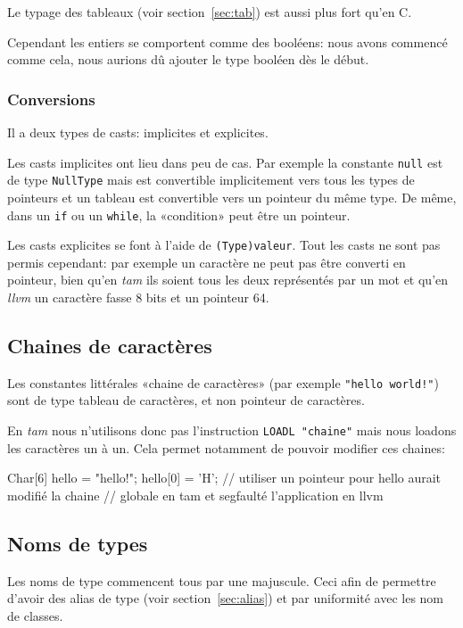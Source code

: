 \documentclass{scrartcl}
\newcommand{\llvm}{\textit{llvm}}
\newcommand{\tam} {\textit{tam}}
\begin{document}
    Le typage des tableaux (voir section~\ref{sec:tab}) est aussi plus fort qu'en C.

    Cependant les entiers se comportent comme des booléens: nous avons commencé
    comme cela, nous aurions dû ajouter le type booléen dès le début.

    \subsubsection{Conversions}
      Il a deux types de casts: implicites et explicites.

      Les casts implicites ont lieu dans peu de cas. Par exemple la constante
      \verb+null+ est de type \verb+NullType+ mais est convertible
      implicitement vers tous les types de pointeurs et un tableau est
      convertible vers un pointeur du même type. De même, dans un \verb+if+ ou
      un \verb+while+, la «condition» peut être un pointeur.

      Les casts explicites se font à l'aide de \verb+(Type)valeur+. Tout les
      casts ne sont pas permis cependant: par exemple un caractère ne peut pas
      être converti en pointeur, bien qu'en \tam{} ils soient tous les deux
      représentés par un mot et qu'en \llvm{} un caractère fasse 8 bits et un
      pointeur 64.

    \subsection{Chaines de caractères}
      Les constantes littérales «chaine de caractères» (par exemple
      \verb+"hello world!"+) sont de type tableau de caractères, et non
      pointeur de caractères.

      En \tam{} nous n'utilisons donc pas l'instruction \verb+LOADL "chaine"+
      mais nous loadons les caractères un à un. Cela permet notamment de
      pouvoir modifier ces chaines:
      \begin{moccode}
Char[6] hello = "hello!";
hello[0] = 'H'; // utiliser un pointeur pour hello aurait modifié la chaine
                // globale en tam et segfaulté l'application en llvm
      \end{moccode}

  \subsection{Noms de types}
    Les noms de type commencent tous par une majuscule. Ceci afin de permettre
    d'avoir des alias de type (voir section~\ref{sec:alias}) et par uniformité
    avec les nom de classes.
\end{document}
